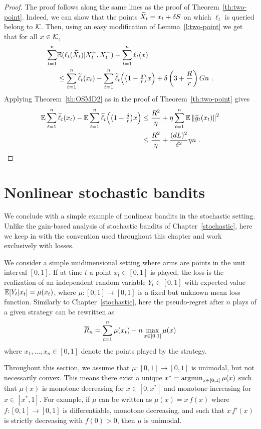 \begin{proof}
The proof follows along the same lines as the proof of Theorem~\ref{th:two-point}. Indeed, we can show that the points $\widetilde{X}_t = x_t + \delta S$ on which $\ell_t$ is queried belong to $\mathcal{K}$. Then, using an easy modification of Lemma~\ref{l:two-point} we get that for all $x\in\mathcal{K}$,
\begin{align*}
    \sum_{t=1}^n & \mathbb{E}(\ell_t(\widetilde{X}_t)| X_t^+, X_t^-) - \sum_{t=1}^n \ell_t(x)
\\& \le
    \sum_{t=1}^n \widetilde{\ell}_t(x_t) - \sum_{t=1}^n \widetilde{\ell}_t\Bigl(\bigl(1-\tfrac{\delta}{r}\bigr)x\Bigr) + \delta\left(3 + \frac{R}{r} \right) G n~.
\end{align*}
Applying Theorem~\ref{th:OSMD2} as in the proof of Theorem~\ref{th:two-point} gives
\begin{align*}
    \mathbb{E} \sum_{t=1}^n \widetilde{\ell}_t(x_t) - \mathbb{E} \sum_{t=1}^n \widetilde{\ell}_t\Bigl(\bigl(1-\tfrac{\delta}{r}\bigr)x\Bigr)
& \le
    \frac{R^2}{\eta} + \eta\sum_{t=1}^n \mathbb{E} \left\|{\widetilde{g}_t(x_t)}\right\|^2
\\& \le
    \frac{R^2}{\eta} + \frac{(dL)^2}{\delta^2}\eta n~.
\end{align*}
\end{proof}


\section{Nonlinear stochastic bandits}
\label{s:nonlinear-stochastic}
%
We conclude with a simple example of nonlinear bandits in the stochastic setting. Unlike the gain-based analysis of stochastic bandits of Chapter~\ref{stochastic}, here we keep in with the convention used throughout this chapter and work exclusively with losses.

We consider a simple unidimensional setting where arms are points in the unit interval $[0,1]$. If at time $t$ a point $x_t \in [0,1]$ is played, the loss is the realization of an independent random variable $Y_t\in [0,1]$ with expected value $\mathbb{E}[Y_t | x_t] = \mu(x_t)$, where $\mu : [0,1]\to [0,1]$ is a fixed but unknown mean loss function. Similarly to Chapter~\ref{stochastic}, here the pseudo-regret after $n$ plays of a given strategy can be rewritten as
\[
    \overline{R}_n = \sum_{t=1}^n \mu(x_t) - n\max_{x\in [0,1]}\mu(x)
\]
where $x_1,\dots,x_n \in [0,1]$ denote the points played by the strategy.

Throughout this section, we assume that $\mu : [0,1] \to [0,1]$ is unimodal, but not necessarily convex. This means there exist a unique $x^* = \mathop{\mathrm{argmin}}_{x \in [0,1]} \mu(x)$ such that $\mu(x)$ is monotone decreasing for $x \in [0,x^*]$ and monotone increasing for $x \in [x^*,1]$. For example, if $\mu$ can be written as $\mu(x) = x\,f(x)$ where $f : [0,1] \to [0,1]$ is differentiable, monotone decreasing, and such that $x\,f'(x)$ is strictly decreasing with $f(0) > 0$, then $\mu$ is unimodal.

